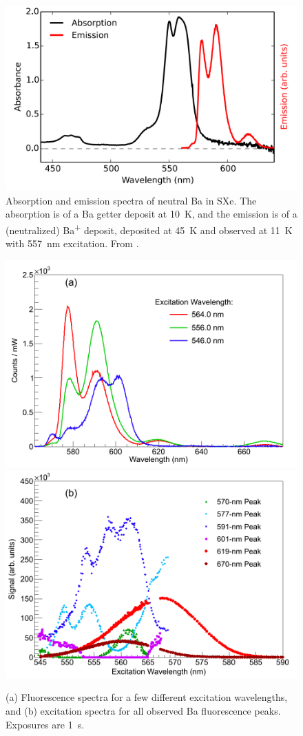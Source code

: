 \begin{figure} %
        \centering
                \includegraphics[width=.7\textwidth]{figures/BaAbs_fromBaSpec.png}
                \caption{Absorption and emission spectra of neutral Ba in SXe.  The absorption is of a Ba getter deposit at 10~K, and the emission is of a (neutralized) Ba\textsuperscript{+} deposit, deposited at 45~K and observed at 11~K with 557~nm excitation.  From \cite{Mong2015}.}
\label{fig:BaAbs}
\end{figure}

\begin{figure} %
        \centering
                \includegraphics[width=.8\textwidth]{figures/excitspec_grn_spectra_v3.png}
                \includegraphics[width=.8\textwidth]{figures/excitspec_grn.png}
                \caption{(a) Fluorescence spectra for a few different excitation wavelengths, and (b) excitation spectra for all observed Ba fluorescence peaks.  Exposures are 1~s.}
\label{fig:excitspecGrn}
\end{figure}

